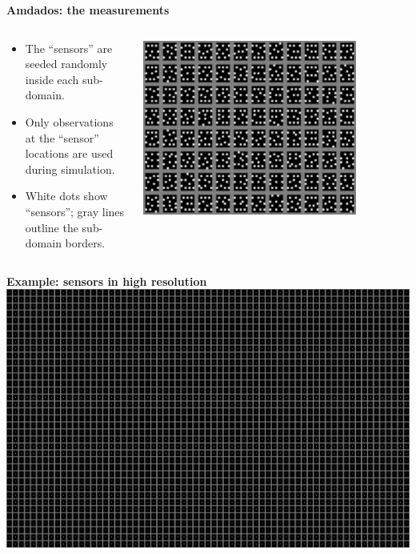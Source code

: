\documentclass[12pt]{beamer}
\newcommand{\myTitle}{\rmfamily\bfseries}
\begin{document}
\begin{frame}{\myTitle Amdados: the measurements}
\begin{columns}[c, onlytextwidth]     %
\begin{column}{.33\textwidth}%
\setlength{\partopsep}{0pt}                %
{\small \begin{itemize}
\item The ``sensors'' are seeded randomly inside each sub-domain.
\item Only observations at the “sensor” locations are used during simulation.
\item White dots show ``sensors''; gray lines outline the sub-domain borders.
\end{itemize}}
\end{column}%
\begin{column}{.75\textwidth}
\begin{center}
\includegraphics[width=0.8\textwidth,keepaspectratio]{images/sensors-small.eps}
\end{center}
\end{column}%
\end{columns}
\end{frame}

\begin{frame}{\myTitle Example: sensors in high resolution}
\includegraphics[width=\textwidth,keepaspectratio]{images/sensors-big.eps}
\end{frame}
\end{document}
